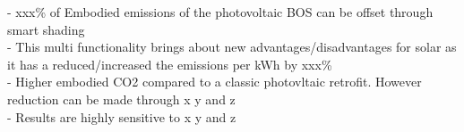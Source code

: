 
- xxx\% of Embodied emissions of the photovoltaic BOS can be offset through smart shading\\
- This multi functionality brings about new advantages/disadvantages for solar as it has a reduced/increased the emissions per kWh by xxx\% \\
- Higher embodied CO2 compared to a classic photovltaic retrofit. However reduction can be made through x y and z\\
- Results are highly sensitive to x y and z\\
